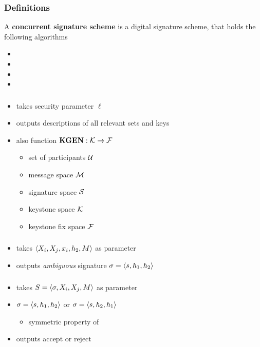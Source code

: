 \begin{frame}
	\frametitle{Definitions}

	\begin{definition}
		A \textbf{concurrent signature scheme} is a digital signature scheme, that holds the following algorithms
		\begin{itemize}
			\item \setup
			\item \asign
			\item \averify
			\item \verify
		\end{itemize}
	\end{definition}
\end{frame}

\begin{frame}
	\frametitle{\setup}

	\begin{itemize}
		\item takes security parameter $\ell$
		\item outputs descriptions of all relevant sets and keys
		\item also function $\textbf{KGEN}: \mathcal{K} \to \mathcal{F}$
			\begin{itemize}
				\item set of participants $\mathcal{U}$
				\item message space $\mathcal{M}$
				\item signature space $\mathcal{S}$
				\item keystone space $\mathcal{K}$
				\item keystone fix space $\mathcal{F}$
			\end{itemize}
	\end{itemize}
\end{frame}

\begin{frame}
	\frametitle{\asign}

	\begin{itemize}
		\item takes $\langle X_i, X_j, x_i, h_2, M \rangle$ as parameter
		\item outputs \textit{ambiguous} signature $\sigma = \langle s, h_1, h_2 \rangle$
	\end{itemize}
\end{frame}

\begin{frame}
	\frametitle{\averify}

	\begin{itemize}
		\item takes $S = \langle \sigma, X_i, X_j, M \rangle$ as parameter
		\item $\sigma = \langle s, h_1, h_2 \rangle$ or  $\sigma = \langle s, h_2, h_1 \rangle$
			\begin{itemize}
				\item symmetric property of \averify
			\end{itemize}
		\item outputs accept or reject
	\end{itemize}
\end{frame}

